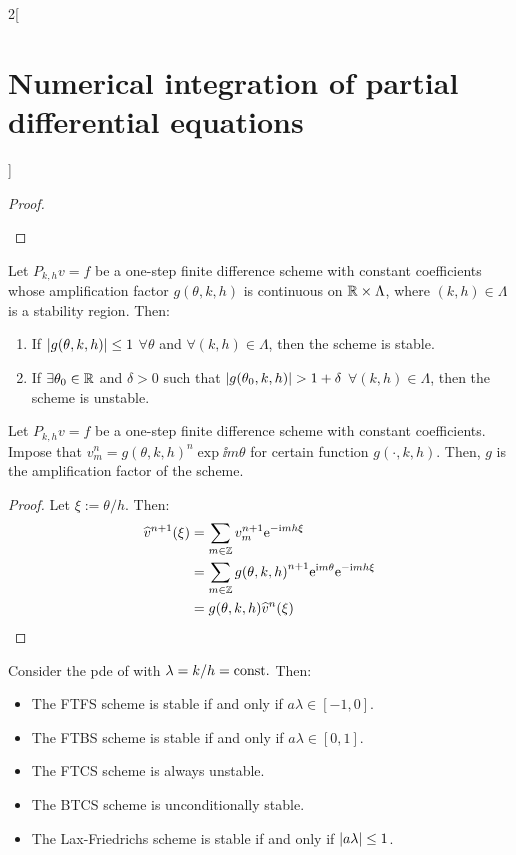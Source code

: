\documentclass[../../../main_math.tex]{subfiles}
\begin{document}
\begin{multicols}{2}[\section{Numerical integration of partial differential equations}]
\begin{proof}
\begin{enumerate}
    \end{enumerate}
  \end{proof}
  \begin{corollary}
    Let $P_{k,h}{v}={f}$ be a one-step finite difference scheme with constant coefficients whose amplification factor $g(\theta,k,h)$ is continuous on $\mathbb{R}\times\Lambda$, where $(k,h)\in\Lambda$ is a stability region. Then:
    \begin{enumerate}
      \item If $\abs{g(\theta,k,h)}\leq 1$ $\forall \theta$ and $\forall(k,h)\in\Lambda$, then the scheme is stable.
      \item If $\exists\theta_0\in\mathbb{R}$ and $\delta>0$ such that $\abs{g(\theta_0,k,h)}>1+\delta$ $\forall(k,h)\in\Lambda$, then the scheme is unstable.
    \end{enumerate}
  \end{corollary}
  \begin{lemma}
    Let $P_{k,h}{v}={f}$ be a one-step finite difference scheme with constant coefficients. Impose that $v_m^n= {g(\theta,k,h)}^n\exp{\ii m\theta}$ for certain function $g(\cdot,k,h)$. Then, $g$ is the amplification factor of the scheme.
  \end{lemma}
  \begin{proof}Let $\xi:=\theta/h$. Then:
    \begin{align*}
      \widehat{v}^{n+1}(\xi) & =\sum_{m\in\mathbb{Z}} v_m^{n+1}\mathrm{e}^{-\mathrm{i} mh\xi}                              \\
                             & =\sum_{m\in\mathbb{Z}} {g(\theta,k,h)}^{n+1}\mathrm{e}^{\mathrm{i} m\theta}\mathrm{e}^{-\mathrm{i} mh\xi} \\
                             & =g(\theta,k,h)\widehat{v}^n(\xi)
    \end{align*}
  \end{proof}
  \begin{proposition}
    Consider the pde of  with $\lambda =k/h=\text{const.}$ Then:
    \begin{itemize}
      \item The FTFS scheme is stable if and only if $a\lambda\in [-1,0]$.
      \item The FTBS scheme is stable if and only if $a\lambda\in [0,1]$.
      \item The FTCS scheme is always unstable.
      \item The BTCS scheme is unconditionally stable.
      \item The Lax-Friedrichs scheme is stable if and only if $\abs{a\lambda}\leq 1$.

\end{itemize}
\end{proposition}
\end{multicols}
\end{document}
